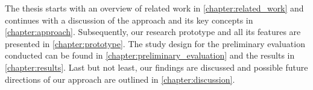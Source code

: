 
The thesis starts with an overview of related work in \autoref{chapter:related_work} and continues with a discussion of the approach and its key concepts in \autoref{chapter:approach}. Subsequently, our research prototype and all its features are presented in \autoref{chapter:prototype}. The study design for the preliminary evaluation conducted can be found in \autoref{chapter:preliminary_evaluation} and the results in \autoref{chapter:results}. Last but not least, our findings are discussed and possible future directions of our approach are outlined in \autoref{chapter:discussion}.